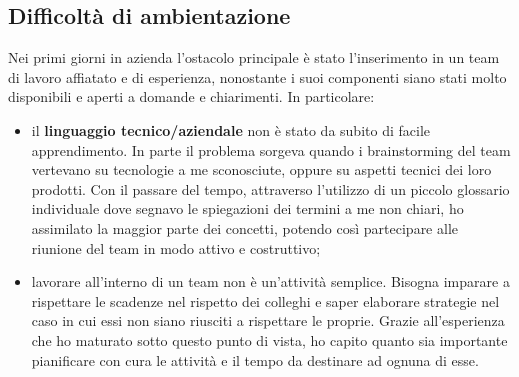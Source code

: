 \subsection{Difficoltà di ambientazione}
Nei primi giorni in azienda l'ostacolo principale è stato l'inserimento in un team di lavoro affiatato e di esperienza, nonostante i suoi componenti siano stati molto disponibili e aperti a domande e chiarimenti. In particolare:
\begin{itemize}
	\item il \textbf{linguaggio tecnico/aziendale} non è stato da subito di facile apprendimento. In parte il problema sorgeva quando i brainstorming del team vertevano su tecnologie a me sconosciute, oppure su aspetti tecnici dei loro prodotti. Con il passare del tempo, attraverso l'utilizzo di un piccolo glossario individuale dove segnavo le spiegazioni dei termini a me non chiari, ho assimilato la maggior parte dei concetti, potendo così partecipare alle riunione del team in modo attivo e costruttivo;
	\item lavorare all'interno di un team non è un'attività semplice. Bisogna imparare a rispettare le scadenze nel rispetto dei colleghi e saper elaborare strategie nel caso in cui essi non siano riusciti a rispettare le proprie. Grazie all'esperienza che ho maturato sotto questo punto di vista, ho capito quanto sia importante pianificare con cura le attività e il tempo da destinare ad ognuna di esse.
\end{itemize}

